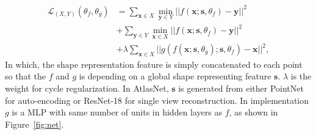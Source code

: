 \begin{equation}
\begin{aligned}
\label{equ:atlascycle}
\mathcal{L}_{(X,Y)}(\theta_f,\theta_g) &= \sum_{\mathbf{x} \in X} \min_{\mathbf{y} \in Y}|| f(\mathbf{x};\mathbf{s},\theta_f) - \mathbf{y} ||^2 \\ &+ \sum_{ \mathbf{y} \in Y}\min_{ \mathbf{x} \in X} || f(\mathbf{x};\mathbf{s},\theta_f) - \mathbf{y} ||^2 \\ &+ \lambda\sum_{\mathbf{x} \in X}||g(f(\mathbf{x};\mathbf{s},\theta_g);\mathbf{s},\theta_f) - \mathbf{x}||^2,
\end{aligned}
 \end{equation}
In which, the shape representation feature is simply concatenated to each point so that the $f$ and $g$ is depending on a global shape representing feature $\mathbf{s}$. $\lambda$ is the weight for cycle regularization. In AtlasNet, $\mathbf{s}$ is generated from either PointNet \cite{resnet} for auto-encoding or ResNet-18 \cite{resnet} for single view reconstruction. In implementation $g$ is a MLP with same number of units in hidden layers as $f$, as shown in Figure~\ref{fig:net}.

